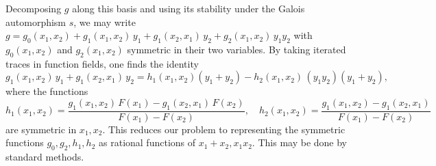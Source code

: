 \documentclass[a4paper,twoside,english]{amsart}
\theoremstyle{plain}
\theoremstyle{definition}
\begin{document}
Decomposing $g$ along this basis and using its stability under the Galois automorphism $s$, we may write $g= g_0(x_1, x_2) + g_1(x_1,x_2) \, y_1 + g_1(x_2, x_1) \, y_2 + g_2(x_1, x_2) \, y_1y_2$ with $g_0(x_1, x_2)$ and $g_2(x_1, x_2)$ symmetric in their two variables. By taking iterated traces in function fields, one finds the identity
\begin{equation}\label{eq: representing g}
g_1(x_1,x_2) \, y_1 + g_1(x_2, x_1) \, y_2 = h_1(x_1, x_2) (y_1+y_2) - h_2(x_1, x_2) \, (y_1y_2)(y_1+y_2),
\end{equation}
where the functions
\[
h_1(x_1,x_2) = \frac{g_1(x_1,x_2) \, F(x_1) - g_1(x_2, x_1) \, F(x_2)}{F(x_1)-F(x_2)}, \quad h_2(x_1, x_2)=\frac{ g_1(x_1,x_2)  - g_1(x_2, x_1) }{F(x_1)-F(x_2)}
\]
are symmetric in $x_1, x_2$. This reduces our problem to representing the symmetric functions $g_0, g_2, h_1, h_2$ as rational functions of $x_1+x_2, x_1x_2$. This may be done by standard methods.
\end{document}
